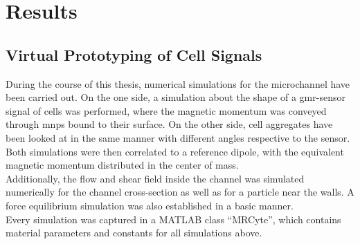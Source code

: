 \chapter{Results}
\section{Virtual Prototyping of Cell Signals}

During the course of this thesis, numerical simulations for the microchannel have been carried out. On the one side, a simulation about the shape of a \gls{gmr}-sensor signal of cells was performed, where the magnetic momentum was conveyed through \glspl{mnp} bound to their surface. On the other side, cell aggregates have been looked at in the same manner with different angles respective to the sensor. Both simulations were then correlated to a reference dipole, with the equivalent magnetic momentum distributed in the center of mass.\\
Additionally, the flow and shear field inside the channel was simulated numerically for the channel cross-section as well as for a particle near the walls. A force equilibrium simulation was also established in a basic manner. \\
Every simulation was captured in a MATLAB class ``MRCyte'', which contains material parameters and constants for all simulations above.
